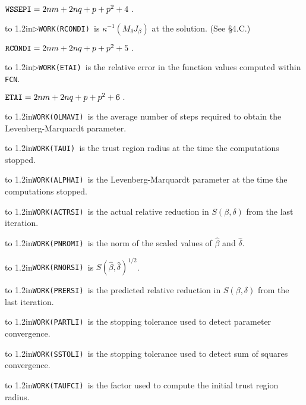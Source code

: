 \aligntobox ${\tt WSSEPI} = 2nm + 2nq + p + p^2 + 4\ .$
\bigskip

\hangindent\wd\mybox{}\noindent\hbox to
1.2in{$\triangleright$\hfill\tt WORK(RCONDI) }is $\kappa^{-1}(M_\delta
J_\beta)$ at the solution. (See \S 4.C.)

\aligntobox ${\tt RCONDI} = 2nm + 2nq + p + p^2 + 5\ .$
\bigskip

\hangindent\wd\mybox{}\noindent\hbox to
1.2in{$\triangleright$\hfill\tt WORK(ETAI) }is the relative error in the function values computed within {\tt FCN}.

\aligntobox ${\tt ETAI} = 2nm + 2nq + p + p^2 + 6\ .$
\bigskip

\hangindent\wd\mybox{}\noindent\hbox to
1.2in{\hfill\tt WORK(OLMAVI) }is the average number of steps required to obtain the Levenberg-Marquardt parameter.\bigskip

\hangindent\wd\mybox{}\noindent\hbox to
1.2in{\hfill\tt WORK(TAUI) }is the trust region radius at the time the computations stopped.\bigskip

\hangindent\wd\mybox{}\noindent\hbox to
1.2in{\hfill\tt WORK(ALPHAI) }is the Levenberg-Marquardt parameter at the time the computations stopped.\bigskip

\hangindent\wd\mybox{}\noindent\hbox to
1.2in{\hfill\tt WORK(ACTRSI) }is the actual relative reduction in $S(\beta,\delta)$ from the last iteration.\bigskip

\hangindent\wd\mybox{}\noindent\hbox to
1.2in{\hfill\tt WORK(PNROMI) }is the norm of the scaled values of $\hat{\beta}$ and $\hat{\delta}$.\bigskip

\hangindent\wd\mybox{}\noindent\hbox to
1.2in{\hfill\tt WORK(RNORSI) }is $S(\hat{\beta},\hat{\delta})^{1/2}$.\bigskip

\hangindent\wd\mybox{}\noindent\hbox to
1.2in{\hfill\tt WORK(PRERSI) }is the predicted relative reduction in $S(\beta,\delta)$ from the last iteration.\bigskip

\hangindent\wd\mybox{}\noindent\hbox to
1.2in{\hfill\tt WORK(PARTLI) }is the stopping tolerance used to detect parameter convergence.\bigskip

\hangindent\wd\mybox{}\noindent\hbox to
1.2in{\hfill\tt WORK(SSTOLI) }is the stopping tolerance used to detect sum of squares convergence.\bigskip

\hangindent\wd\mybox{}\noindent\hbox to
1.2in{\hfill\tt WORK(TAUFCI) }is the factor used to compute the initial trust region radius.\bigskip

